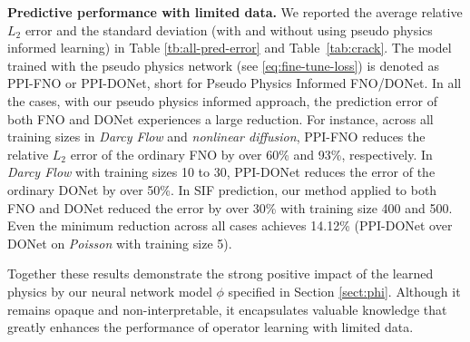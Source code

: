 \noindent\textbf{Predictive performance with limited data.} We reported the average relative $L_2$ error and the standard deviation (with and without using pseudo physics informed learning) in Table \ref{tb:all-pred-error} and Table~\ref{tab:crack}. The model trained with the pseudo physics network (see \eqref{eq:fine-tune-loss}) is denoted as PPI-FNO or PPI-DONet, short for Pseudo Physics Informed FNO/DONet.
In all the cases, with our pseudo physics informed approach, the prediction error of both FNO and DONet experiences a large reduction. For instance, across all training sizes in \textit{Darcy Flow} and \textit{nonlinear diffusion}, PPI-FNO reduces the relative $L_2$ error of the ordinary FNO by over 60\% and 93\%, respectively. In \textit{Darcy Flow} with training sizes 10 to 30, PPI-DONet reduces the error of the ordinary DONet by over 50\%. {In SIF prediction, our method applied to both FNO and DONet reduced the error by over 30\% with training size 400 and 500.}
Even the minimum reduction across all cases achieves 14.12\% (PPI-DONet over DONet on \textit{Poisson} with training size 5). 

Together these results demonstrate the strong positive impact of the learned physics by our neural network model $\phi$ specified in Section \ref{sect:phi}. Although it remains opaque and non-interpretable, it encapsulates valuable knowledge that greatly enhances the performance of operator learning with limited data.

